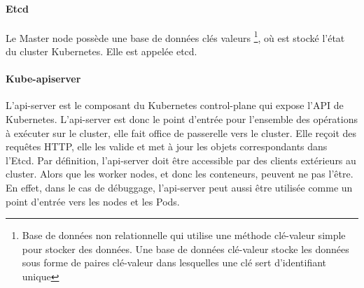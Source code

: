 \documentclass[11pt,fleqn]{book} %
\begin{document}
\paragraph*{Etcd}
Le Master node possède une base de données clés valeurs \footnote{Base de données non relationnelle qui utilise une méthode clé-valeur simple pour stocker des données. Une base de données clé-valeur stocke les données sous forme de paires clé-valeur dans lesquelles une clé sert d'identifiant unique}, où est stocké l'état du cluster Kubernetes. Elle est appelée etcd.

\paragraph*{Kube-apiserver}
L'api-server est le composant du Kubernetes control-plane qui expose l'API de Kubernetes. L'api-server est donc le point d'entrée pour l'ensemble des opérations à exécuter sur le cluster, elle fait office de passerelle vers le cluster. Elle reçoit des requêtes HTTP, elle les valide et met à jour les objets correspondants dans l'Etcd. Par définition, l'api-server doit être accessible par des clients extérieurs au cluster. Alors que les worker nodes, et donc les conteneurs, peuvent ne pas l'être. En effet, dans le cas de débuggage, l'api-server peut aussi être utilisée comme un point d'entrée vers les nodes et les Pods.
\end{document}
